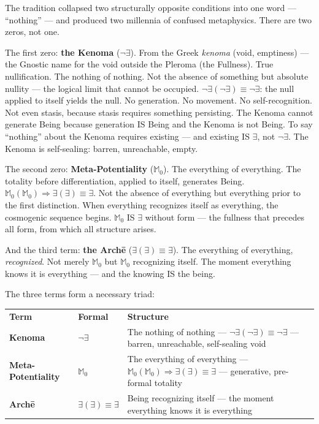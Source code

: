 \documentclass[10pt, openany, oneside]{book}
\renewcommand{\footnotesize}{\fontsize{8.5}{11}\selectfont}
\begin{document}
The tradition collapsed two structurally opposite conditions into one word --- ``nothing'' --- and produced two millennia of confused metaphysics. There are two zeros, not one.

The first zero: \textbf{the Kenoma} ($\neg\exists$). From the Greek \textit{kenoma} (void, emptiness) --- the Gnostic name for the void outside the Pleroma (the Fullness). True nullification. The nothing of nothing. Not the absence of something but absolute nullity --- the logical limit that cannot be occupied. $\neg\exists(\neg\exists) \equiv \neg\exists$: the null applied to itself yields the null. No generation. No movement. No self-recognition. Not even stasis, because stasis requires something persisting. The Kenoma cannot generate Being because generation IS Being and the Kenoma is not Being. To say ``nothing'' about the Kenoma requires existing --- and existing IS $\exists$, not $\neg\exists$. The Kenoma is self-sealing: barren, unreachable, empty.

The second zero: \textbf{Meta-Potentiality} ($\mathbb{M}_0$). The everything of everything. The totality before differentiation, applied to itself, generates Being. $\mathbb{M}_0(\mathbb{M}_0) \Rightarrow \exists(\exists) \equiv \exists$. Not the absence of everything but everything prior to the first distinction. When everything recognizes itself as everything, the cosmogenic sequence begins. $\mathbb{M}_0$ IS $\exists$ without form --- the fullness that precedes all form, from which all structure arises.

And the third term: \textbf{the Arch\={e}} ($\exists(\exists) \equiv \exists$). The everything of everything, \textit{recognized}. Not merely $\mathbb{M}_0$ but $\mathbb{M}_0$ recognizing itself. The moment everything knows it is everything --- and the knowing IS the being.

The three terms form a necessary triad:

\vspace{0.5em}

{\footnotesize
\noindent\begin{tabular}{l l p{}}
\textbf{Term} & \textbf{Formal} & \textbf{Structure} \\[0.4em]
\textbf{Kenoma} & $\neg\exists$ & The nothing of nothing --- $\neg\exists(\neg\exists) \equiv \neg\exists$ --- barren, unreachable, self-sealing void \\[0.3em]
\textbf{Meta-Potentiality} & $\mathbb{M}_0$ & The everything of everything --- $\mathbb{M}_0(\mathbb{M}_0) \Rightarrow \exists(\exists) \equiv \exists$ --- generative, pre-formal totality \\[0.3em]
\textbf{Arch\={e}} & $\exists(\exists) \equiv \exists$ & Being recognizing itself --- the moment everything knows it is everything \\[0.3em]
\end{tabular}
}
\end{document}
